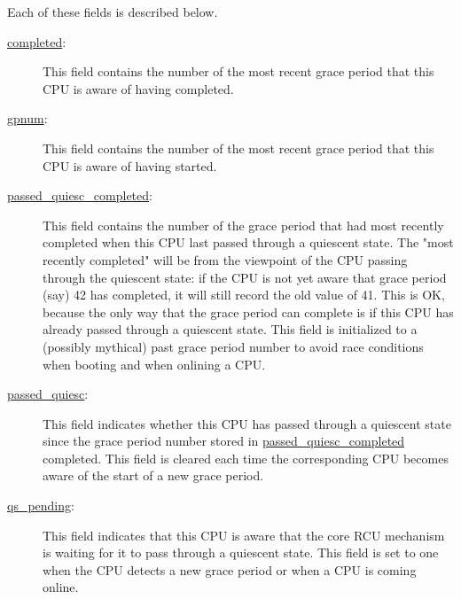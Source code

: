 Each of these fields is described below.

\begin{description}
\item[\url{completed}:]
	This field contains the number of the most recent grace period
	that this CPU is aware of having completed.
\item[\url{gpnum}:]
	This field contains the number of the most recent grace period
	that this CPU is aware of having started.
\item[\url{passed_quiesc_completed}:]
	This field contains the number of the grace period that had most
	recently completed when this
	CPU last passed through a quiescent state.
	The "most recently completed" will be from the viewpoint of
	the CPU passing through the quiescent state: if the CPU is
	not yet aware that grace period (say) 42 has completed, it
	will still record the old value of 41.
	This is OK, because the only way that the grace period can
	complete is if this CPU has already passed through a
	quiescent state.
	This field is initialized to a (possibly mythical) past
	grace period number to avoid race conditions when booting
	and when onlining a CPU.
\item[\url{passed_quiesc}:]
	This field indicates whether this CPU has passed
	through a quiescent state since the grace period number
	stored in \url{passed_quiesc_completed} completed.
	This field is cleared each time the corresponding CPU
	becomes aware of the start of a new grace period.
\item[\url{qs_pending}:]
	This field indicates that this CPU is aware that the core
	RCU mechanism is waiting for it to pass through a quiescent state.
	This field is set to one when the CPU detects a new grace
	period or when a CPU is coming online.

 \QuickQuizEnd

\end{description}
